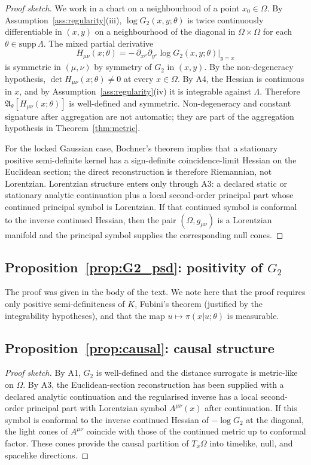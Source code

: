 ﻿\documentclass[12pt,a4paper]{article}
\theoremstyle{definition}
\begin{document}
\begin{proof}[Proof sketch]
We work in a chart on a neighbourhood of a point $x_0 \in \Omega$. By Assumption~\ref{ass:regularity}(iii), $\log G_2(x,y;\theta)$ is twice continuously differentiable in $(x,y)$ on a neighbourhood of the diagonal in $\Omega \times \Omega$ for each $\theta \in \mathrm{supp}\,\Lambda$. The mixed partial derivative
\[
H_{\mu\nu}(x;\theta) = -\,\partial_{x^\mu}\partial_{y^\nu}\log G_2(x,y;\theta)\Big|_{y=x}
\]
is symmetric in $(\mu,\nu)$ by symmetry of $G_2$ in $(x,y)$. By the non-degeneracy hypothesis, $\det H_{\mu\nu}(x;\theta) \neq 0$ at every $x \in \Omega$. By A4, the Hessian is continuous in $x$, and by Assumption~\ref{ass:regularity}(iv) it is integrable against $\Lambda$. Therefore $\mathfrak{A}_\theta[H_{\mu\nu}(x;\theta)]$ is well-defined and symmetric. Non-degeneracy and constant signature after aggregation are not automatic; they are part of the aggregation hypothesis in Theorem~\ref{thm:metric}.

For the locked Gaussian case, Bochner's theorem implies that a stationary positive semi-definite kernel has a sign-definite coincidence-limit Hessian on the Euclidean section; the direct reconstruction is therefore Riemannian, not Lorentzian. Lorentzian structure enters only through A3: a declared static or stationary analytic continuation plus a local second-order principal part whose continued principal symbol is Lorentzian. If that continued symbol is conformal to the inverse continued Hessian, then the pair $(\Omega,g_{\mu\nu})$ is a Lorentzian manifold and the principal symbol supplies the corresponding null cones.
\end{proof}

\subsection[Proposition: positivity of G2]{Proposition~\ref{prop:G2_psd}: positivity of $G_2$}

The proof was given in the body of the text. We note here that the proof requires only positive semi-definiteness of $K$, Fubini's theorem (justified by the integrability hypotheses), and that the map $u \mapsto \pi(x|u;\theta)$ is measurable.

\subsection{Proposition~\ref{prop:causal}: causal structure}

\begin{proof}[Proof sketch]
By A1, $G_2$ is well-defined and the distance surrogate is metric-like on $\Omega$. By A3, the Euclidean-section reconstruction has been supplied with a declared analytic continuation and the regularised inverse has a local second-order principal part with Lorentzian symbol $A^{\mu\nu}(x)$ after continuation. If this symbol is conformal to the inverse continued Hessian of $-\log G_2$ at the diagonal, the light cones of $A^{\mu\nu}$ coincide with those of the continued metric up to conformal factor. These cones provide the causal partition of $T_x\Omega$ into timelike, null, and spacelike directions.
\end{proof}
\end{document}
